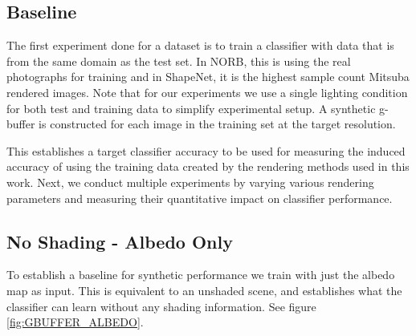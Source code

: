 \subsection{Baseline}
The first experiment done for a dataset is to train a classifier with data that is from the same domain as the test set.  In NORB, this is using the real photographs for training and in ShapeNet, it is the highest sample count Mitsuba rendered images. 
Note that for our experiments we use a single lighting condition for both test and training data to simplify experimental setup.  
A synthetic g-buffer is constructed for each image in the training set at the target resolution.

This establishes a target classifier accuracy to be used for measuring the induced accuracy of using the training data created by the rendering methods used in this work. Next, we conduct multiple experiments by varying various rendering parameters and measuring their quantitative impact on classifier performance.  %



\subsection{No Shading - Albedo Only}
To establish a baseline for synthetic performance we train with just the albedo map as input.  This is equivalent to an unshaded scene, and establishes what the classifier can learn without any shading information. See figure \ref{fig:GBUFFER_ALBEDO}.  
